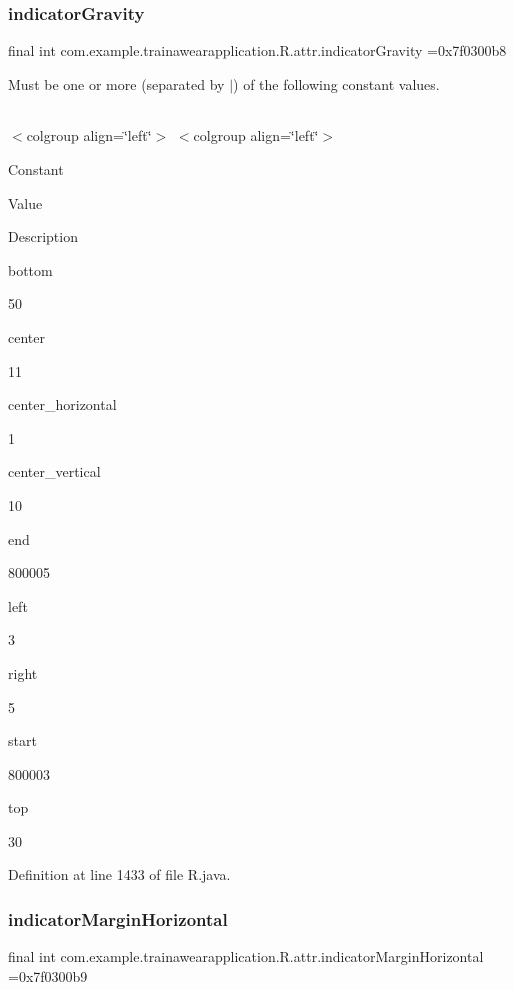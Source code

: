 \subsubsection{\texorpdfstring{indicatorGravity}{indicatorGravity}}
{\footnotesize\ttfamily final int com.\+example.\+trainawearapplication.\+R.\+attr.\+indicator\+Gravity =0x7f0300b8\hspace{0.3cm}{\ttfamily [static]}}

Must be one or more (separated by \textquotesingle{}$\vert$\textquotesingle{}) of the following constant values.

\tabulinesep=1mm
\begin{longtabu}spread 0pt [c]{*{0}{|X[-1]}|}
\hline
\end{longtabu}
$<$colgroup align=\char`\"{}left\char`\"{}$>$ $<$colgroup align=\char`\"{}left\char`\"{}$>$ 

Constant

Value

Description 

bottom

50

center

11

center\+\_\+horizontal

1

center\+\_\+vertical

10

end

800005

left

3

right

5

start

800003

top

30

Definition at line 1433 of file R.\+java.

\mbox{\label{classcom_1_1example_1_1trainawearapplication_1_1_r_1_1attr_a43fa7f7a70bc53d67676f4be9a3d4a21}} 
\subsubsection{\texorpdfstring{indicatorMarginHorizontal}{indicatorMarginHorizontal}}
{\footnotesize\ttfamily final int com.\+example.\+trainawearapplication.\+R.\+attr.\+indicator\+Margin\+Horizontal =0x7f0300b9\hspace{0.3cm}{\ttfamily [static]}}

